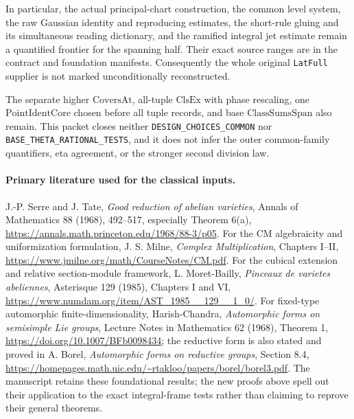 In particular, the actual principal-chart construction,
the common level system, the raw Gaussian identity and
reproducing estimates, the short-rule gluing and its
simultaneous reading dictionary, and the ramified
integral jet estimate remain a quantified frontier
for the spanning half.  Their exact source ranges
are in the contract and foundation manifests.
Consequently the whole original \texttt{LatFull}
supplier is not marked unconditionally reconstructed.

The separate higher \(\mathrm{CoversAt}\), all-tuple
\(\mathrm{ClsEx}\) with phase rescaling, one
\(\mathrm{PointIdentCore}\) chosen before all tuple
records, and base \(\mathrm{ClassSumsSpan}\) also
remain.  This packet closes neither
\texttt{DESIGN\_CHOICES\_COMMON} nor
\texttt{BASE\_THETA\_RATIONAL\_TESTS}, and it
does not infer the outer common-family quantifiers,
eta agreement, or the stronger second division law.

\paragraph{Primary literature used for the classical inputs.}
J.-P. Serre and J. Tate, \emph{Good reduction of abelian
varieties}, Annals of Mathematics 88 (1968), 492--517,
especially Theorem 6(a),
\url{https://annals.math.princeton.edu/1968/88-3/p05}.
For the CM algebraicity and uniformization formulation,
J. S. Milne, \emph{Complex Multiplication}, Chapters I--II,
\url{https://www.jmilne.org/math/CourseNotes/CM.pdf}.
For the cubical extension and relative section-module
framework, L. Moret-Bailly, \emph{Pinceaux de varietes
abeliennes}, Asterisque 129 (1985), Chapters I and VI,
\url{https://www.numdam.org/item/AST_1985__129__1_0/}.
For fixed-type automorphic finite-dimensionality,
Harish-Chandra, \emph{Automorphic forms on semisimple
Lie groups}, Lecture Notes in Mathematics 62 (1968),
Theorem 1,
\url{https://doi.org/10.1007/BFb0098434}; the reductive
form is also stated and proved in A. Borel,
\emph{Automorphic forms on reductive groups}, Section 8.4,
\url{https://homepages.math.uic.edu/~rtakloo/papers/borel/borel3.pdf}.
The manuscript retains these foundational results;
the new proofs above spell out their application to
the exact integral-frame tests rather than claiming
to reprove their general theorems.
